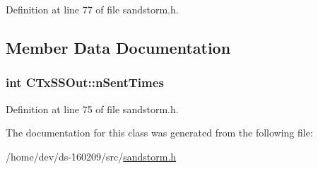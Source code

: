 Definition at line 77 of file sandstorm.\+h.



\subsection{Member Data Documentation}
\hypertarget{class_c_tx_s_s_out_a53ee4b2b2b26614a055b6946f5b4c267}{}
\subsubsection[{n\+Sent\+Times}]{\setlength{\rightskip}{0pt plus 5cm}int C\+Tx\+S\+S\+Out\+::n\+Sent\+Times}\label{class_c_tx_s_s_out_a53ee4b2b2b26614a055b6946f5b4c267}


Definition at line 75 of file sandstorm.\+h.



The documentation for this class was generated from the following file\+:\begin{DoxyCompactItemize}
\item 
/home/dev/ds-\/160209/src/\hyperlink{sandstorm_8h}{sandstorm.\+h}\end{DoxyCompactItemize}
